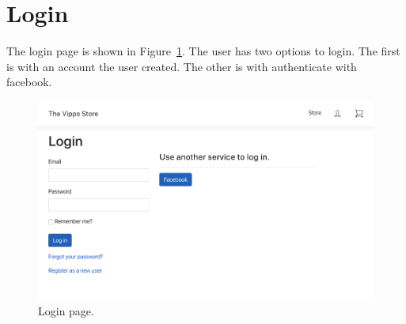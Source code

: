 \documentclass[11pt,a4paper,english]{article}
\begin{document}
\section*{Login}
The login page is shown in Figure~\ref{fig:login}. The user has two options to login. The first is with an account the user created. The other is with authenticate with facebook.
\begin{figure}[htbp]
  \centering
  \includegraphics[scale=0.3]{login}
  \caption{Login page.}
  \label{fig:login}
\end{figure}
\end{document}
